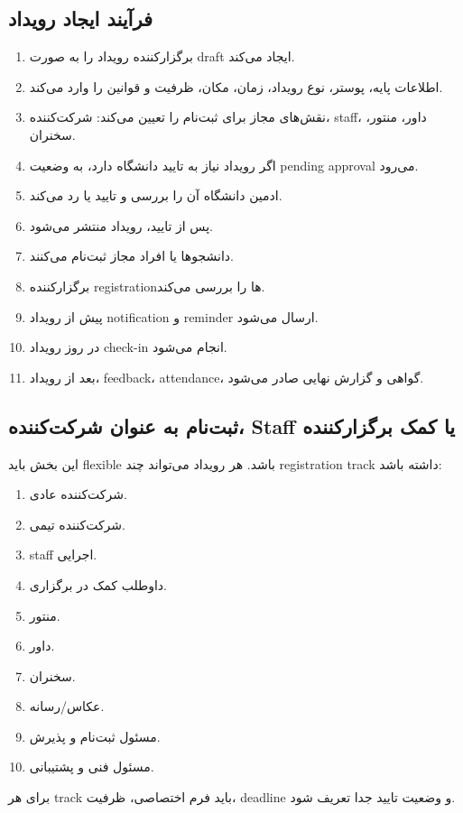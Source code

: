 \documentclass[12pt,a4paper]{article}
\begin{document}
\subsection{فرآیند ایجاد رویداد}
\begin{enumerate}
\item برگزارکننده رویداد را به صورت draft ایجاد می‌کند.
\item اطلاعات پایه، پوستر، نوع رویداد، زمان، مکان، ظرفیت و قوانین را وارد می‌کند.
\item نقش‌های مجاز برای ثبت‌نام را تعیین می‌کند: شرکت‌کننده، staff، داور، منتور، سخنران.
\item اگر رویداد نیاز به تایید دانشگاه دارد، به وضعیت pending approval می‌رود.
\item ادمین دانشگاه آن را بررسی و تایید یا رد می‌کند.
\item پس از تایید، رویداد منتشر می‌شود.
\item دانشجوها یا افراد مجاز ثبت‌نام می‌کنند.
\item برگزارکننده registrationها را بررسی می‌کند.
\item پیش از رویداد notification و reminder ارسال می‌شود.
\item در روز رویداد check-in انجام می‌شود.
\item بعد از رویداد، feedback، attendance، گواهی و گزارش نهایی صادر می‌شود.
\end{enumerate}

\subsection{ثبت‌نام به عنوان شرکت‌کننده، Staff یا کمک برگزارکننده}
این بخش باید flexible باشد. هر رویداد می‌تواند چند registration track داشته باشد:
\begin{enumerate}
\item شرکت‌کننده عادی.
\item شرکت‌کننده تیمی.
\item staff اجرایی.
\item داوطلب کمک در برگزاری.
\item منتور.
\item داور.
\item سخنران.
\item عکاس/رسانه.
\item مسئول ثبت‌نام و پذیرش.
\item مسئول فنی و پشتیبانی.
\end{enumerate}
برای هر track باید فرم اختصاصی، ظرفیت، deadline و وضعیت تایید جدا تعریف شود.
\end{document}
